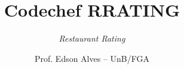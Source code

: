 \title{Codechef RRATING}
\subtitle{\textit{Restaurant Rating}}
\author{Prof. Edson Alves -- UnB/FGA}
\date{}
